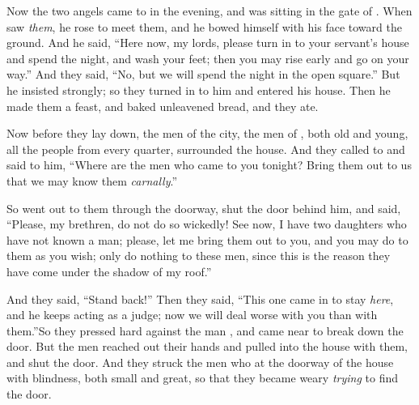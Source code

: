 
\bverse Now the two angels came to  in the evening, and  was sitting in the gate of . When  saw \textit{them}, he rose to meet them, and he bowed himself with his face toward the ground.
\bverse And he said, ``Here now, my lords, please turn in to your servant's house and spend the night, and wash your feet; then you may rise early and go on your way.'' And they said, ``No, but we will spend the night in the open square.''
\bverse But he insisted strongly; so they turned in to him and entered his house. Then he made them a feast, and baked unleavened bread, and they ate.

\bverse Now before they lay down, the men of the city, the men of , both old and young, all the people from every quarter, surrounded the house.
\bverse And they called to  and said to him, ``Where are the men who came to you tonight? Bring them out to us that we may know them \textit{carnally}.''

\bverse So  went out to them through the doorway, shut the door behind him, 
\bverse and said, ``Please, my brethren, do not do so wickedly! 
\bverse See now, I have two daughters who have not known a man; please, let me bring them out to you, and you may do to them as you wish; only do nothing to these men, since this is the reason they have come under the shadow of my roof.''

\bverse And they said, ``Stand back!'' Then they said, ``This one came in to stay \textit{here}, and he keeps acting as a judge; now we will deal worse with you than with them.''So they pressed hard against the man , and came near to break down the door.
\bverse But the men reached out their hands and pulled  into the house with them, and shut the door.
\bverse And they struck the men who \were at the doorway of the house with blindness, both small and great, so that they became weary \textit{trying} to find the door.


